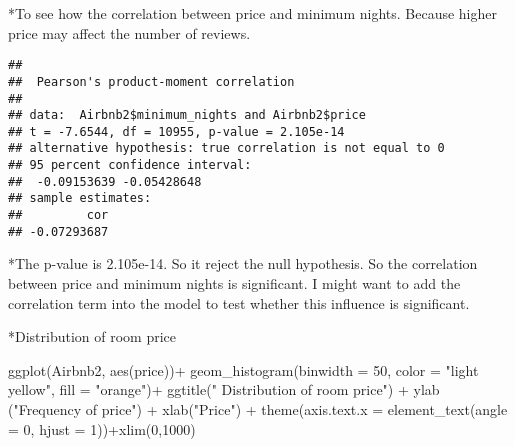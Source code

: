 \documentclass[
]{article}
\newenvironment{Shaded}{\begin{snugshade}}{\end{snugshade}}
\newcommand{\AttributeTok}[1]{\textcolor[rgb]{0.77,0.63,0.00}{#1}}
\newcommand{\DecValTok}[1]{\textcolor[rgb]{0.00,0.00,0.81}{#1}}
\newcommand{\FunctionTok}[1]{\textcolor[rgb]{0.00,0.00,0.00}{#1}}
\newcommand{\NormalTok}[1]{#1}
\newcommand{\OtherTok}[1]{\textcolor[rgb]{0.56,0.35,0.01}{#1}}
\newcommand{\SpecialCharTok}[1]{\textcolor[rgb]{0.00,0.00,0.00}{#1}}
\newcommand{\StringTok}[1]{\textcolor[rgb]{0.31,0.60,0.02}{#1}}
\begin{document}
*To see how the correlation between price and minimum nights. Because
higher price may affect the number of reviews.

\begin{Shaded}
\end{Shaded}

\begin{verbatim}
## 
##  Pearson's product-moment correlation
## 
## data:  Airbnb2$minimum_nights and Airbnb2$price
## t = -7.6544, df = 10955, p-value = 2.105e-14
## alternative hypothesis: true correlation is not equal to 0
## 95 percent confidence interval:
##  -0.09153639 -0.05428648
## sample estimates:
##         cor 
## -0.07293687
\end{verbatim}

*The p-value is 2.105e-14. So it reject the null hypothesis. So the
correlation between price and minimum nights is significant. I might
want to add the correlation term into the model to test whether this
influence is significant.

*Distribution of room price

\begin{Shaded}
\begin{Highlighting}[]
\FunctionTok{ggplot}\NormalTok{(Airbnb2, }\FunctionTok{aes}\NormalTok{(price))}\SpecialCharTok{+} \FunctionTok{geom\_histogram}\NormalTok{(}\AttributeTok{binwidth =} \DecValTok{50}\NormalTok{, }\AttributeTok{color =} \StringTok{"light yellow"}\NormalTok{, }\AttributeTok{fill =} \StringTok{"orange"}\NormalTok{)}\SpecialCharTok{+} \FunctionTok{ggtitle}\NormalTok{(}\StringTok{" Distribution of room price"}\NormalTok{) }\SpecialCharTok{+} \FunctionTok{ylab}\NormalTok{ (}\StringTok{"Frequency of price"}\NormalTok{) }\SpecialCharTok{+} \FunctionTok{xlab}\NormalTok{(}\StringTok{"Price"}\NormalTok{) }\SpecialCharTok{+} \FunctionTok{theme}\NormalTok{(}\AttributeTok{axis.text.x =} \FunctionTok{element\_text}\NormalTok{(}\AttributeTok{angle =} \DecValTok{0}\NormalTok{, }\AttributeTok{hjust =} \DecValTok{1}\NormalTok{))}\SpecialCharTok{+}\FunctionTok{xlim}\NormalTok{(}\DecValTok{0}\NormalTok{,}\DecValTok{1000}\NormalTok{)}
\end{Highlighting}
\end{Shaded}
\end{document}
